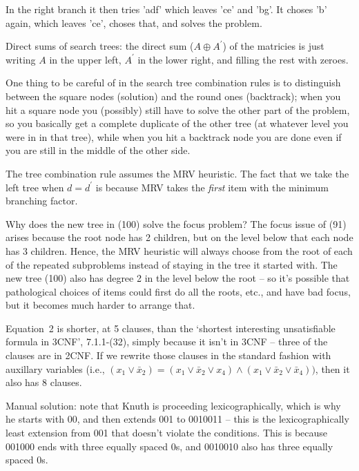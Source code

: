 In the right branch it then tries 'adf' which leaves 'ce' and 'bg'.
It choses 'b' again, which leaves 'ce', choses that, and solves the problem.


 Direct sums of search trees: the direct sum ($A \oplus A^{\prime}$)
of the matricies is just writing $A$ in the upper left, $A^{\prime}$ in the
lower right, and filling the rest with zeroes.

One thing to be careful of in the search tree combination rules is to
distinguish between the square nodes (solution) and the round ones (backtrack);
when you hit a square node you (possibly) still have to solve the other
part of the problem, so you basically get a complete duplicate of the other
tree (at whatever level you were in in that tree), while when you hit a
backtrack node you are done even if you are still in the middle of the other
side.

The tree combination rule assumes the MRV heuristic.  The fact that we
take the left tree when $d = d^{\prime}$ is because MRV takes the {\it first}
item with the minimum branching factor.


 Why does the new tree in (100) solve the focus problem?
The focus issue of (91) arises because the root node has 2 children, but on
the level below that each node has 3 children.  Hence, the MRV heuristic will
always choose from the root of each of the repeated subproblems instead of 
staying in the tree it started with.  The new tree (100) also has degree 2
in the level below the root -- so it's possible that pathological choices
of items could first do all the roots, etc., and have bad focus, but it becomes
much harder to arrange that.


 Equation~2 is shorter, at 5 clauses, than the `shortest
interesting unsatisfiable formula in 3CNF', 7.1.1-(32), simply because it isn't
in 3CNF -- three of the clauses are in 2CNF.  If we rewrite those clauses in 
the standard fashion with auxillary variables (i.e., $\left(x_1 \vee {\bar x}_2 \right) =
\left(x_1 \vee {\bar x}_2 \vee x_4\right) \wedge \left(x_1 \vee {\bar x}_2 \vee {\bar x}_4\right))$,
then it also has 8 clauses.


 Manual solution: note that Knuth is proceeding lexicographically,
which is why he starts with 00, and then extends 001 to 0010011 -- this
is the lexicographically least extension from 001 that doesn't violate
the conditions.  This is because 001000 ends with three equally spaced 0s,
and 0010010 also has three equally spaced 0s.

